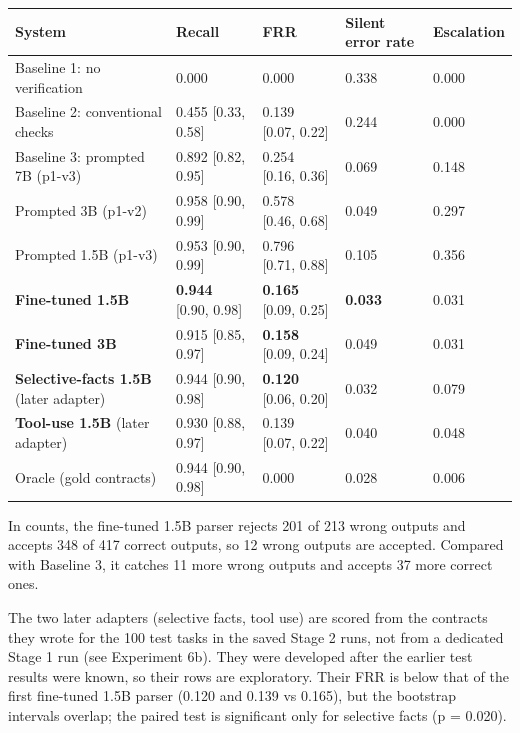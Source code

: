 \documentclass[11pt]{article}
\begin{document}
\begin{table}[!tp]
\centering\footnotesize\setlength{\tabcolsep}{3pt}\renewcommand{\arraystretch}{1.1}
\begin{tabularx}{\textwidth}{>{\raggedright\arraybackslash}Xllll}
\toprule
\textbf{System} & \textbf{Recall} & \textbf{FRR} & \textbf{Silent error rate} & \textbf{Escalation} \\
\midrule
Baseline 1: no verification & 0.000 & 0.000 & 0.338 & 0.000 \\
Baseline 2: conventional checks & 0.455 [0.33, 0.58] & 0.139 [0.07, 0.22] & 0.244 & 0.000 \\
Baseline 3: prompted 7B (p1-v3) & 0.892 [0.82, 0.95] & 0.254 [0.16, 0.36] & 0.069 & 0.148 \\
Prompted 3B (p1-v2) & 0.958 [0.90, 0.99] & 0.578 [0.46, 0.68] & 0.049 & 0.297 \\
Prompted 1.5B (p1-v3) & 0.953 [0.90, 0.99] & 0.796 [0.71, 0.88] & 0.105 & 0.356 \\
\textbf{Fine-tuned 1.5B} & \textbf{0.944} [0.90, 0.98] & \textbf{0.165} [0.09, 0.25] & \textbf{0.033} & 0.031 \\
\textbf{Fine-tuned 3B} & 0.915 [0.85, 0.97] & \textbf{0.158} [0.09, 0.24] & 0.049 & 0.031 \\
\textbf{Selective-facts 1.5B} (later adapter) & 0.944 [0.90, 0.98] & \textbf{0.120} [0.06, 0.20] & 0.032 & 0.079 \\
\textbf{Tool-use 1.5B} (later adapter) & 0.930 [0.88, 0.97] & 0.139 [0.07, 0.22] & 0.040 & 0.048 \\
Oracle (gold contracts) & 0.944 [0.90, 0.98] & 0.000 & 0.028 & 0.006 \\
\bottomrule
\end{tabularx}
\end{table}

In counts, the fine-tuned 1.5B parser rejects 201 of 213 wrong outputs
and accepts 348 of 417 correct outputs, so 12 wrong outputs are
accepted. Compared with Baseline 3, it catches 11 more wrong outputs and
accepts 37 more correct ones.

The two later adapters (selective facts, tool use) are scored from the
contracts they wrote for the 100 test tasks in the saved Stage 2 runs,
not from a dedicated Stage 1 run (see Experiment 6b). They were
developed after the earlier test results were known, so their rows are
exploratory. Their FRR is below that of the first fine-tuned 1.5B parser
(0.120 and 0.139 vs 0.165), but the bootstrap intervals overlap; the
paired test is significant only for selective facts (p = 0.020).
\end{document}
